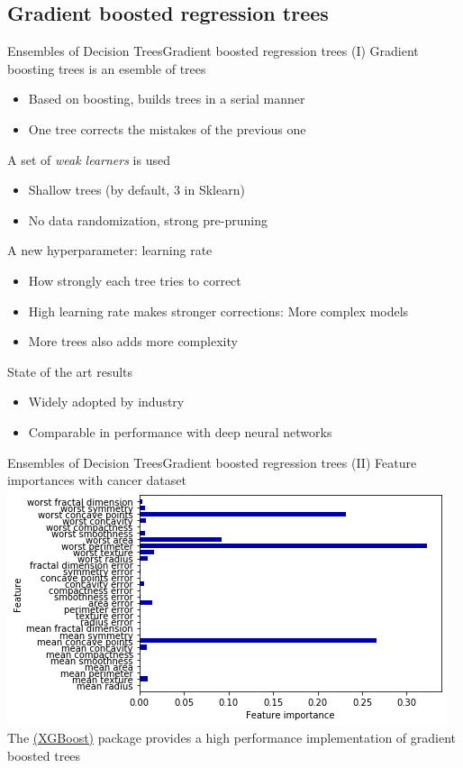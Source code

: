\documentclass[10pt,compress]{beamer} %
\begin{document}
\subsection{Gradient boosted regression trees}
\begin{frame}{Ensembles of Decision Trees}{Gradient boosted regression trees (I)}
    \alert{Gradient boosting} trees is an esemble of trees 
    \begin{itemize}
        \item Based on boosting, builds trees in a serial manner
        \item One tree corrects the mistakes of the previous one
    \end{itemize}

    A set of \textit{weak learners} is used
    \begin{itemize}
        \item Shallow trees (by default, $3$ in Sklearn)
        \item No data randomization, strong pre-pruning
    \end{itemize}

    A new hyperparameter: learning rate
    \begin{itemize}
        \item How strongly each tree tries to correct
        \item High learning rate makes stronger corrections: More complex models
        \item More trees also adds more complexity
    \end{itemize}

    State of the art results
    \begin{itemize}
        \item Widely adopted by industry
        \item Comparable in performance with deep neural networks
    \end{itemize}
\end{frame}

\begin{frame}{Ensembles of Decision Trees}{Gradient boosted regression trees (II)}
    Feature importances with cancer dataset\\
    \bigskip
    \centering \includegraphics[width=0.8\linewidth]{figs/gradientboosting.png}\\
    \medskip
    \flushleft The \href{https://xgboost.ai/}{(XGBoost)} package provides a high performance implementation of gradient boosted trees
\end{frame}
\end{document}
